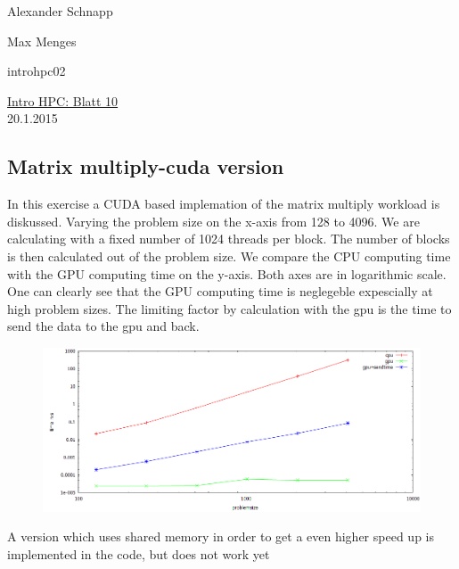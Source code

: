 \documentclass[a4paper,11pt]{scrartcl}
\begin{document}
\hfill Alexander Schnapp

\hfill Max Menges

\hfill introhpc02

\begin{center}
\underline{\Huge{Intro HPC: Blatt 10}}\\
\large{20.1.2015}\\
\end{center}



\subsection{Matrix multiply-cuda version}
In this exercise a CUDA based implemation of the matrix multiply workload is diskussed. Varying the problem size on the x-axis from 128 to 4096. 
We are calculating with a fixed number of 1024 threads per block. The number of blocks is then calculated out of the problem size.
We compare the CPU computing time with the GPU computing time on the y-axis. Both axes are in logarithmic scale. One can clearly see that the GPU computing time is neglegeble expescially at high problem sizes. The limiting factor by calculation with the gpu is the time to send the data to the gpu and back.

\begin{figure}[htbp]
\includegraphics[width=\linewidth,
keepaspectratio]{10.1.test/vergleich}
\centering
\end{figure}

A version which uses shared memory in order to get a even higher speed up is implemented in the code, but does not work yet
\end{document}
